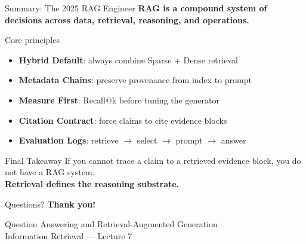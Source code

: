 \documentclass[aspectratio=169, xcolor=table]{beamer}
\newif\ifanimated
\newcommand{\cpause}{\ifanimated\pause\fi}
\begin{document}
\begin{frame}{Summary: The 2025 RAG Engineer}
\textbf{RAG is a compound system of decisions across data, retrieval, reasoning, and operations.}

\vspace{0.3em}
\begin{block}{Core principles}
\footnotesize
\begin{itemize}
  \item \textbf{Hybrid Default}: always combine Sparse + Dense retrieval
  \item \textbf{Metadata Chains}: preserve provenance from index to prompt
  \item \textbf{Measure First}: Recall@k before tuning the generator
  \item \textbf{Citation Contract}: force claims to cite evidence blocks
  \item \textbf{Evaluation Logs}: retrieve $\to$ select $\to$ prompt $\to$ answer
\end{itemize}
\end{block}

\cpause
\vspace{0.3em}
\begin{block}{Final Takeaway}
\small
If you cannot trace a claim to a retrieved evidence block, you do not have a RAG system.\\[0.5em]
\textbf{Retrieval defines the reasoning substrate.}
\end{block}
\end{frame}

\begin{frame}{Questions?}
\centering
\Large \textbf{Thank you!}

\vspace{2em}
\normalsize
Question Answering and Retrieval-Augmented Generation\\[0.5em]
\small Information Retrieval --- Lecture 7
\end{frame}
\end{document}
